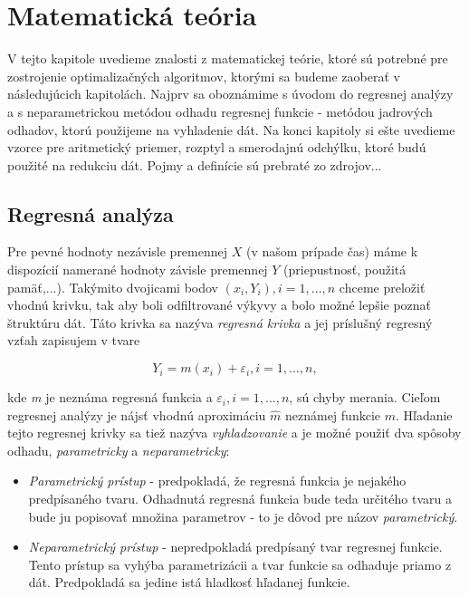 \chapter{Matematická teória}

V tejto kapitole uvedieme znalosti z matematickej teórie, ktoré sú potrebné pre zostrojenie optimalizačných algoritmov, ktorými sa budeme zaoberať v následujúcich kapitolách. Najprv sa oboznámime s úvodom do regresnej analýzy a s neparametrickou metódou odhadu regresnej funkcie - metódou jadrových odhadov, ktorú použijeme na vyhladenie dát. Na konci kapitoly si ešte uvedieme vzorce pre aritmetický priemer, rozptyl a smerodajnú odchýlku, ktoré budú použité na redukciu dát. Pojmy a definície sú prebraté zo zdrojov...


\section{Regresná analýza}
Pre pevné hodnoty nezávisle premennej $X$ (v našom prípade čas)  máme k dispozícií namerané hodnoty závisle premennej $Y$ (priepustnosť, použitá pamäť,...). Takýmito dvojicami bodov $(x_i, Y_i), i = 1,...,n$ chceme preložiť vhodnú krivku, tak aby boli odfiltrované výkyvy a bolo možné lepšie poznať štruktúru dát. Táto krivka sa nazýva \textit{regresná krivka} a jej príslušný regresný vzťah zapisujem v tvare

\begin{equation}
Y_i = m(x_i) + \varepsilon _i, i=1,...,n,
\end{equation}

kde \textit{m} je neznáma regresná funkcia a $\varepsilon _i, i = 1,...,n$, sú chyby merania. Cieľom regresnej analýzy je nájsť vhodnú aproximáciu $\hat{m}$ neznámej funkcie $m$. Hľadanie tejto regresnej krivky sa tiež nazýva \textit{vyhladzovanie} a je možné použiť dva spôsoby odhadu, \textit{parametricky} a \textit{neparametricky}:
\begin{itemize}
\item \textit{Parametrický prístup} - predpokladá, že regresná funkcia je nejakého predpísaného tvaru. Odhadnutá regresná funkcia bude teda určitého tvaru a bude ju popisovať množina parametrov - to je dôvod pre názov \textit{parametrický}.
\item \textit{Neparametrický prístup} - nepredpokladá predpísaný tvar regresnej funkcie. Tento prístup sa vyhýba parametrizácii a tvar funkcie sa odhaduje priamo z dát. Predpokladá sa jedine istá hladkosť hľadanej funkcie.
\end{itemize}

